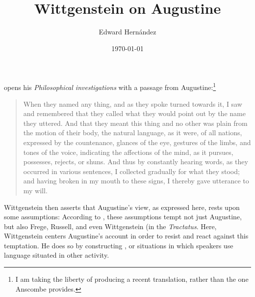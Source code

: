 \documentclass[doc,12pt,apacite,biblatex]{apa6}
\begin{document}
 \title{Wittgenstein on Augustine}
\author{Edward Hern\'{a}ndez}
\date{\today}

\maketitle

 opens his \emph{Philosophical investigations} with a
passage from Augustine:\footnote{I am taking the liberty of producing a recent
translation, rather than the one Anscombe provides.} \begin{quote} When they
	named any thing, and as they spoke turned towards it, I saw and
	remembered that they called what they would point out by the name they
	uttered. And that they meant this thing and no other was plain from the
	motion of their body, the natural language, as it were, of all nations,
	expressed by the countenance, glances of the eye, gestures of the
	limbs, and tones of the voice, indicating the affections of the mind,
	as it pursues, possesses, rejects, or shuns. And thus by constantly
	hearing words, as they occurred in various sentences, I collected
	gradually for what they stood; and having broken in my mouth to these
	signs, I thereby gave utterance to my will.  \cite[\S~1.8.13]{Pusey09}
\end{quote}
Wittgenstein then asserts that Augustine's view, as expressed here,
rests upon some assumptions: 
According to \cite{McGinn97}, these assumptions tempt not just Augustine, but
also Frege, Russell, and even Wittgenstein (in the \emph{Tractatus}. 
Here, Wittgenstein centers 
Augustine's account in order to resist and react against
this temptation. He does so by constructing , or situations
in which speakers use language situated in other activity.
\end{document}
